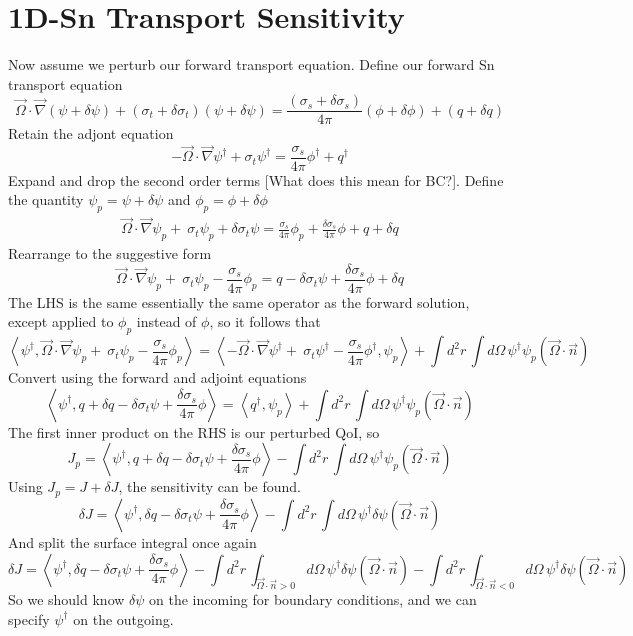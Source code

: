 \documentclass{article}
\newcommand{\vO}{\vec{\Omega}}
\newcommand{\bra}{\left\langle}
\newcommand{\ket}{\right\rangle}
\newcommand{\vgrad}{\vec{\nabla}}
\begin{document}
\section{1D-Sn Transport Sensitivity}
Now assume we perturb our forward transport equation.
Define our forward Sn transport equation
\[
\vO \cdot \vgrad \left( \psi + \delta \psi \right) + \left( \sigma_t + \delta \sigma_t \right) \left( \psi + \delta \psi \right) = \frac{\left( \sigma_s + \delta \sigma_s \right)}{4 \pi} \left( \phi + \delta \phi \right) + \left( q + \delta q \right)
\]
Retain the adjont equation
\[
- \vO \cdot \vgrad \psi^\dag + \sigma_t \psi^\dag = \frac{\sigma_s}{4 \pi} \phi^\dag + q^\dag
\]
Expand and drop the second order terms [What does this mean for BC?]. Define the quantity $\psi_p = \psi + \delta \psi$ and $\phi_p = \phi + \delta \phi$
\begin{align*}
\vO \cdot \vgrad  \psi_p + \ \sigma_t \psi_p + \delta \sigma_t \psi = \frac{ \sigma_s }{4 \pi}  \phi_p + \frac{ \delta \sigma_s }{4 \pi}  \phi  + q + \delta q 
\end{align*}
Rearrange to the suggestive form
\[
\vO \cdot \vgrad  \psi_p + \ \sigma_t \psi_p - \frac{ \sigma_s }{4 \pi}  \phi_p  = q - \delta \sigma_t \psi + \frac{ \delta \sigma_s }{4 \pi}  \phi  + \delta q 
\]
The LHS is the same essentially the same operator as the forward solution, except applied to $\phi_p$ instead of $\phi$, so it follows that 
\[
\bra \psi^\dag , \vO \cdot \vgrad  \psi_p + \ \sigma_t \psi_p - \frac{ \sigma_s }{4 \pi}  \phi_p  \ket = \bra - \vO \cdot \vgrad  \psi^\dag + \ \sigma_t \psi^\dag - \frac{ \sigma_s }{4 \pi}  \phi^\dag , \psi_p \ket +  \int d^2 r \, \int d  \Omega \, \psi^\dag \psi_p ( \vO \cdot \vec{n})
\]
Convert using the forward and adjoint equations
\[
\bra \psi^\dag ,  q + \delta q - \delta \sigma_t \psi + \frac{ \delta \sigma_s }{4 \pi}  \phi   \ket = \bra q^\dag , \psi_p \ket +  \int d^2 r \, \int d  \Omega \, \psi^\dag \psi_p ( \vO \cdot \vec{n})
\]
The first inner product on the RHS is our perturbed QoI, so
\[
J_p = \bra \psi^\dag ,  q + \delta q - \delta \sigma_t \psi + \frac{ \delta \sigma_s }{4 \pi}  \phi     \ket -  \int d^2 r \, \int d  \Omega \, \psi^\dag \psi_p ( \vO \cdot \vec{n})
\] 
Using $J_p = J + \delta J$, the sensitivity can be found. 
\[
\delta J = \bra \psi^\dag ,  \delta q - \delta \sigma_t \psi + \frac{ \delta \sigma_s }{4 \pi}  \phi    \ket -  \int d^2 r \, \int d  \Omega \, \psi^\dag \delta \psi ( \vO \cdot \vec{n})
\] 
And split the surface integral once again
\[
\delta J = \bra \psi^\dag ,  \delta q - \delta \sigma_t \psi + \frac{ \delta \sigma_s }{4 \pi}  \phi    \ket
- \int d^2 r \, \int_{\vO \cdot \vec{n} >0} d  \Omega \, \psi^\dag \delta \psi ( \vO \cdot \vec{n} ) 
- \int d^2 r \, \int_{\vO \cdot \vec{n} <0} d  \Omega \, \psi^\dag \delta \psi ( \vO \cdot \vec{n} )
\]
So we should know $\delta \psi$ on the incoming for boundary conditions, and we can specify $\psi^\dag$ on the outgoing.
\end{document}
